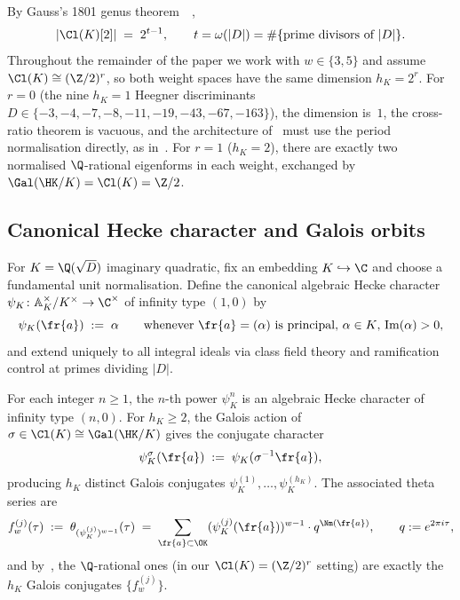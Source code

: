 By Gauss's 1801 genus theorem~\cite{Gauss1801}~\cite[Thm.~3.15]{Cox1989},
\begin{equation}\label{eq:gauss-genus}
|\Cl(K)[2]| \;=\; 2^{t-1}, \qquad
t = \omega(|D|) = \#\{\text{prime divisors of }|D|\}.
\end{equation}
Throughout the remainder of the paper we work with $w \in \{3, 5\}$
and assume $\Cl(K) \cong (\Z/2)^r$, so both weight spaces have the
same dimension $h_K = 2^r$. For $r = 0$ (the nine $h_K = 1$
Heegner discriminants
$D \in \{-3, -4, -7, -8, -11, -19, -43, -67, -163\}$), the dimension
is~$1$, the cross-ratio theorem is vacuous, and the architecture
of~ must use the period normalisation directly, as
in~. For $r = 1$ ($h_K = 2$), there are exactly two
normalised $\Q$-rational eigenforms in each weight, exchanged by
$\Gal(\HK/K) = \Cl(K) = \Z/2$.

\subsection{Canonical Hecke character and Galois orbits}
\label{ss:psi-K}

\begin{definition}\label{def:psiK}
For $K = \Q(\sqrt{D})$ imaginary quadratic, fix an embedding $K
\hookrightarrow \C$ and choose a fundamental unit normalisation.
Define the canonical algebraic Hecke character $\psi_K \colon
\mathbb{A}_K^\times/K^\times \to \C^\times$ of infinity type
$(1, 0)$ by
\begin{equation}
\psi_K(\fr{a}) \;:=\; \alpha
\qquad \text{whenever } \fr{a} = (\alpha)\text{ is principal,
$\alpha \in K$, $\operatorname{Im}(\alpha) > 0$,}
\end{equation}
and extend uniquely to all integral ideals via class field theory
and ramification control at primes dividing $|D|$.
\end{definition}

For each integer $n \geq 1$, the $n$-th power $\psi_K^n$ is an
algebraic Hecke character of infinity type $(n, 0)$. For $h_K \geq
2$, the Galois action of $\sigma \in \Cl(K) \cong \Gal(\HK/K)$
gives the conjugate character
\begin{equation}
\psi_K^{\sigma}(\fr{a}) \;:=\; \psi_K(\sigma^{-1} \fr{a}),
\end{equation}
producing $h_K$ distinct Galois conjugates
$\psi_K^{(1)}, \dots, \psi_K^{(h_K)}$. The associated theta
series are
\begin{equation}\label{eq:theta-series}
f_w^{(j)}(\tau) \;:=\; \theta_{(\psi_K^{(j)})^{w-1}}(\tau)
\;=\; \sum_{\fr{a} \subset \OK} (\psi_K^{(j)}(\fr{a}))^{w-1} \cdot q^{\Nm(\fr{a})},
\qquad q := e^{2\pi i \tau},
\end{equation}
and by~, the $\Q$-rational ones (in our
$\Cl(K) = (\Z/2)^r$ setting) are exactly the $h_K$ Galois
conjugates $\{f_w^{(j)}\}$.

